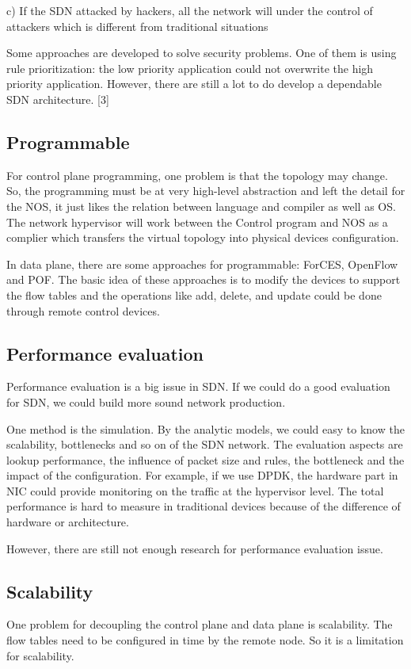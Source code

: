 \documentclass[conference]{IEEEtran}
\begin{document}
c) If the SDN attacked by hackers, all the network will under the control of attackers which is different from traditional situations

Some approaches are developed to solve security problems. One of them is using rule prioritization: the low priority application could not overwrite the high priority application. However, there are still a lot to do develop a dependable SDN architecture. [3]
\subsection{Programmable}
For control plane programming, one problem is that the topology may change. So, the programming must be at very high-level abstraction and left the detail for the NOS, it just likes the relation between language and compiler as well as OS. The network hypervisor will work between the Control program and NOS as a complier which transfers the virtual topology into physical devices configuration.

In data plane, there are some approaches for programmable: ForCES, OpenFlow and POF. The basic idea of these approaches is to modify the devices to support the flow tables and the operations like add, delete, and update could be done through remote control devices.


\subsection{Performance evaluation}
Performance evaluation is a big issue in SDN. If we could do a good evaluation for SDN, we could build more sound network production.

One method is the simulation. By the analytic models, we could easy to know the scalability, bottlenecks and so on of the SDN network. The evaluation aspects are lookup performance, the influence of packet size and rules, the bottleneck and the impact of the configuration. For example, if we use DPDK, the hardware part in NIC could provide monitoring on the traffic at the hypervisor level. The total performance is hard to measure in traditional devices because of the difference of hardware or architecture.

However, there are still not enough research for performance evaluation issue. 
\subsection{Scalability}
 One problem for decoupling the control plane and data plane is scalability. The flow tables need to be configured in time by the remote node. So it is a limitation for scalability.
\end{document}

